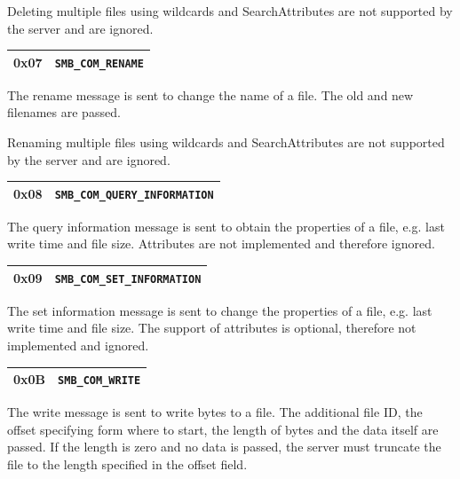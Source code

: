 \documentclass[11pt,a4paper]{book}
\begin{document}
Deleting multiple files using wildcards and SearchAttributes are not supported by the server and are ignored.

\begin{center}
\renewcommand{\tabcolsep}{5mm}
\begin{tabular}{p{3cm}p{8cm}}
0x07 & \texttt{SMB\_COM\_RENAME} \\
\hline
\end{tabular}
\end{center}
The rename message is sent to change the name of a file. The old and new filenames are passed.

Renaming multiple files using wildcards and SearchAttributes are not supported by the server and are ignored.

\begin{center}
\renewcommand{\tabcolsep}{5mm}
\begin{tabular}{p{3cm}p{8cm}}
0x08 & \texttt{SMB\_COM\_QUERY\_INFORMATION} \\
\hline
\end{tabular}
\end{center}
The query information message is sent to obtain the properties of a file, e.g. last write time and file size. Attributes are not implemented and therefore ignored.

\begin{center}
\renewcommand{\tabcolsep}{5mm}
\begin{tabular}{p{3cm}p{8cm}}
0x09 & \texttt{SMB\_COM\_SET\_INFORMATION} \\
\hline
\end{tabular}
\end{center}
The set information message is sent to change the properties of a file, e.g. last write time and file size. The support of attributes is optional, therefore not implemented and ignored.

\begin{center}
\renewcommand{\tabcolsep}{5mm}
\begin{tabular}{p{3cm}p{8cm}}
0x0B & \texttt{SMB\_COM\_WRITE} \\
\hline
\end{tabular}
\end{center}
The write message is sent to write bytes to a file. The additional file ID, the offset specifying form where to start, the length of bytes and the data itself are passed. If the length is zero and no data is passed, the server must truncate the file to the length specified in the offset field.
\end{document}
